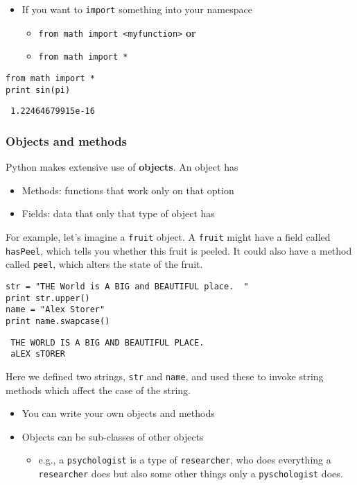 \documentclass[11pt]{article}
\begin{document}
\begin{itemize}
\item If you want to \texttt{import} something into your namespace
\begin{itemize}
\item \texttt{from math import <myfunction>} \textbf{or}
\item \texttt{from math import *}
\end{itemize}
\end{itemize}


\begin{verbatim}
from math import *
print sin(pi)
\end{verbatim}

\begin{verbatim}
 1.22464679915e-16
\end{verbatim}
\subsubsection{Objects and methods}
\label{sec-2-3-4}


Python makes extensive use of \textbf{objects}.  An object has
\begin{itemize}
\item Methods: functions that work only on that option
\item Fields: data that only that type of object has
\end{itemize}

For example, let's imagine a \texttt{fruit} object.  A \texttt{fruit} might have a
field called \texttt{hasPeel}, which tells you whether this fruit is
peeled. It could also have a method called \texttt{peel}, which alters the
state of the fruit.


\begin{verbatim}
str = "THE World is A BIG and BEAUTIFUL place.  "
print str.upper()
name = "Alex Storer"
print name.swapcase()
\end{verbatim}

\begin{verbatim}
 THE WORLD IS A BIG AND BEAUTIFUL PLACE.  
 aLEX sTORER
\end{verbatim}

Here we defined two strings, \texttt{str} and \texttt{name}, and used these to
invoke string methods which affect the case of the string.

\begin{itemize}
\item You can write your own objects and methods
\item Objects can be sub-classes of other objects
\begin{itemize}
\item e.g., a \texttt{psychologist} is a type of \texttt{researcher}, who does
    everything a \texttt{researcher} does but also some other things only
    a \texttt{pyschologist} does.
\end{itemize}
\end{itemize}
\end{document}
